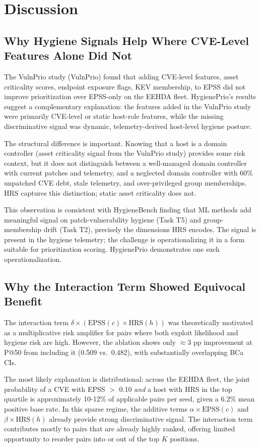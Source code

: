 \section{Discussion}

\subsection{Why Hygiene Signals Help Where CVE-Level Features Alone Did Not}

The VulnPrio study (VulnPrio) found that adding CVE-level features, asset criticality scores, endpoint exposure flags, KEV membership, to EPSS did not improve prioritization over EPSS-only on the EEHDA fleet. HygienePrio's results suggest a complementary explanation: the features added in the VulnPrio study were primarily CVE-level or static host-role features, while the missing discriminative signal was dynamic, telemetry-derived host-level hygiene posture.

The structural difference is important. Knowing that a host is a domain controller (asset criticality signal from the VulnPrio study) provides some risk context, but it does not distinguish between a well-managed domain controller with current patches and telemetry, and a neglected domain controller with 60\% unpatched CVE debt, stale telemetry, and over-privileged group memberships. HRS captures this distinction; static asset criticality does not.

This observation is consistent with HygieneBench finding that ML methods add meaningful signal on patch-vulnerability hygiene (Task T5) and group-membership drift (Task T2), precisely the dimensions HRS encodes. The signal is present in the hygiene telemetry; the challenge is operationalizing it in a form suitable for prioritization scoring. HygienePrio demonstrates one such operationalization.

\subsection{Why the Interaction Term Showed Equivocal Benefit}

The interaction term $\delta \times (\mathrm{EPSS}(c) \times \mathrm{HRS}(h))$ was theoretically motivated as a multiplicative risk amplifier for pairs where both exploit likelihood and hygiene risk are high. However, the ablation shows only $\approx$3 pp improvement at P@50 from including it (0.509 vs.\ 0.482), with substantially overlapping BCa CIs.

The most likely explanation is distributional: across the EEHDA fleet, the joint probability of a CVE with EPSS $>$ 0.10 \emph{and} a host with HRS in the top quartile is approximately 10-12\% of applicable pairs per seed, given a 6.2\% mean positive base rate. In this sparse regime, the additive terms $\alpha \times \mathrm{EPSS}(c)$ and $\beta \times \mathrm{HRS}(h)$ already provide strong discriminative signal. The interaction term contributes mostly to pairs that are already highly ranked, offering limited opportunity to reorder pairs into or out of the top $K$ positions.

